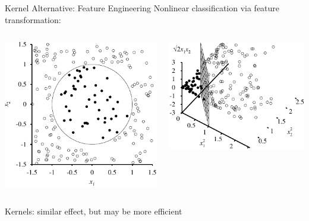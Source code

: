 \documentclass[14pt]{beamer}
\begin{document}
\begin{frame}[label=kernel-alternative]{Kernel Alternative: Feature Engineering}
Nonlinear classification via feature transformation:
\bigskip
\begin{columns}
\begin{column}{0.45\textwidth}
\includegraphics[width=\textwidth]{circle-x1-x2}
\end{column}
\begin{column}{0.45\textwidth}
\includegraphics[width=\textwidth]{circle-x1-x2-x1x2}
\end{column}
\end{columns}
\bigskip
\pause
Kernels: similar effect, but may be more efficient
\end{frame}
\end{document}
